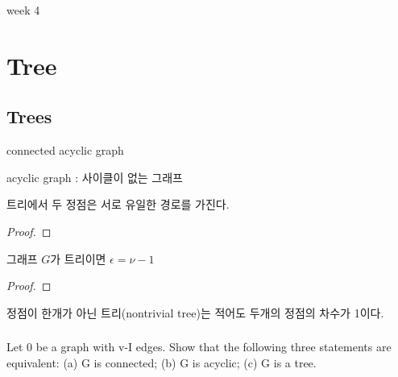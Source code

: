 
week 4
\section{Tree}
\subsection{Trees}

\begin{dfn}[tree] connected acyclic graph

    acyclic graph : 사이클이 없는 그래프
\end{dfn}


\begin{theorem}
    트리에서 두 정점은 서로 유일한 경로를 가진다.    
\end{theorem}

\begin{proof}
    
\end{proof}
\begin{theorem}
    그래프 $G$가 트리이면 $\epsilon = \nu-1$
\end{theorem}

\begin{proof}
    
\end{proof}


\begin{corollary}
    정점이 한개가 아닌 트리(nontrivial tree)는 적어도 두개의 정점의 차수가 1이다.    
\end{corollary}
\subsubsection{} 
%
\subsubsection{} 
%
\subsubsection{} 
%
\subsubsection{} 
%
\subsubsection{} 
Let 0 be a graph with v-I edges. Show that the following three statements are equivalent: 
(a) G is connected;
(b) G is acyclic;
(c) G is a tree.

